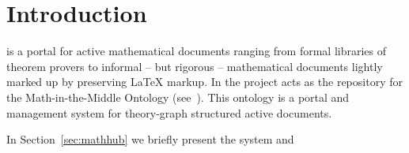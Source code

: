 \section{Introduction}\label{sec:intro}

\sys is a portal for active mathematical documents ranging from formal libraries
of theorem provers to informal -- but rigorous -- mathematical documents lightly marked up
by preserving {\LaTeX} markup. In the \pn project \sys acts as the repository for the
Math-in-the-Middle Ontology (see~\cite{DehKohKon:iop16,ODK-D6.2}). This ontology is a
portal and management system for theory-graph structured active documents. 

In Section~\ref{sec:mathhub} we briefly present the \sys system and

